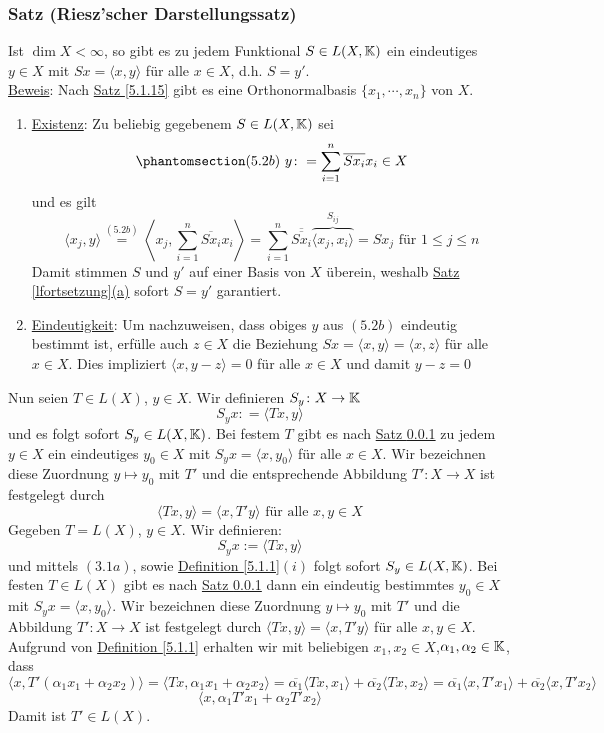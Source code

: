 \subsubsection{Satz (Riesz'scher Darstellungssatz)}
\label{5.2.1}
Ist $\dim X<\infty$, so gibt es zu jedem Funktional $S\in L(X,\mathbb{K})$ ein eindeutiges $y\in X$ mit $Sx=\langle x,y\rangle$ für alle $x\in X$, d.h. $S=y'$.\\
\underline{Beweis}: Nach \hyperref[5.1.15]{Satz \ref{5.1.15}} gibt es eine Orthonormalbasis $\{x_1,\cdots ,x_n\}$ von $X$.
\Romannum
\begin{enumerate}
\item \underline{Existenz}: Zu beliebig gegebenem $S\in L(X,\mathbb{K})$ sei
\[\phantomsection\label{5.2b}(5.2b)\ y\colon = \sum _{i=1}^n \overline{Sx_i}x_i\in X\]
und es gilt
\[\langle x_j,y\rangle \stackrel{\hyperref[5.2b]{(5.2b)}}{=} \left\langle x_j,\sum _{i=1}^n\overline{Sx_i}x_i\right\rangle =\sum _{i=1}^n \overline{\overline{Sx_i}}\overbrace{\langle x_j,x_i\rangle}^{S_{ij}}=Sx_j\text{ für }1\leq j\leq n\]
Damit stimmen $S$ und $y'$ auf einer Basis von $X$ überein, weshalb \hyperref[lfortsetzung]{Satz \ref{lfortsetzung}(a)} sofort $S=y'$ garantiert.
\item \underline{Eindeutigkeit}: Um nachzuweisen, dass obiges $y$ aus \hyperref[5.2b]{$(5.2b)$} eindeutig bestimmt ist, erfülle auch $z\in X$ die Beziehung $Sx=\langle x,y\rangle = \langle x,z\rangle $ für alle $x\in X$.  Dies impliziert $\langle x,y-z\rangle = 0$ für alle $x\in X$ und damit $y-z=0$
\end{enumerate}
Nun seien $T\in L(X)$, $y\in X$.  Wir definieren $S_y\colon X\rightarrow \mathbb{K}$
\[S_yx\colon =\langle Tx,y\rangle\]
und es folgt sofort $S_y\in L(X,\mathbb{K})$.  Bei festem $T$ gibt es nach \hyperref[5.2.1]{Satz \ref{5.2.1}} zu jedem $y\in X$ ein eindeutiges $y_0\in X$ mit $S_yx=\langle x,y_0\rangle$ für alle $x\in X$.  Wir bezeichnen diese Zuordnung $y\mapsto y_0$ mit $T'$ und die entsprechende Abbildung $T' \colon X\rightarrow X$ ist festgelegt durch
\[\langle Tx,y\rangle = \langle x,T' y\rangle\text{ für alle }x,y\in X\]
Gegeben $T=L(X)$, $y\in X$.  Wir definieren:
\[S_yx:=\langle Tx,y\rangle\]
und mittels \hyperref[3.1a]{$(3.1a)$}, sowie \hyperref[5.1.1]{Definition \ref{5.1.1}$(i)$} folgt sofort $S_y\in L(X,\mathbb{K})$.  Bei festen $T\in L(X)$ gibt es nach \hyperref[5.2.1]{Satz \ref{5.2.1}} dann ein eindeutig bestimmtes $y_0\in X$mit $S_yx=\langle x,y_0\rangle$.  Wir bezeichnen diese Zuordnung $y\mapsto y_0$ mit $T'$ und die Abbildung $T'\colon X\rightarrow X$ ist festgelegt durch $\langle Tx,y\rangle=\langle x,T'y\rangle$ für alle $x,y\in X$.  Aufgrund von \hyperref[5.1.1]{Definition \ref{5.1.1}} erhalten wir mit beliebigen $x_1,x_2\in X$,$\alpha _1,\alpha _2\in \mathbb{K}$, dass
\[\langle x,T'(\alpha _1x_1+\alpha _2x_2)\rangle =\langle Tx,\alpha _1x_1+\alpha _2x_2\rangle = \overline{\alpha _1}\langle Tx,x_1\rangle +\overline{\alpha _2}\langle Tx,x_2\rangle=\overline{\alpha _1}\langle x,T'x_1\rangle + \overline{\alpha _2}\langle x,T'x_2\rangle\]
\[\langle x,\alpha _1T'x_1+\alpha _2T'x_2\rangle\]
Damit ist $T'\in L(X)$.
